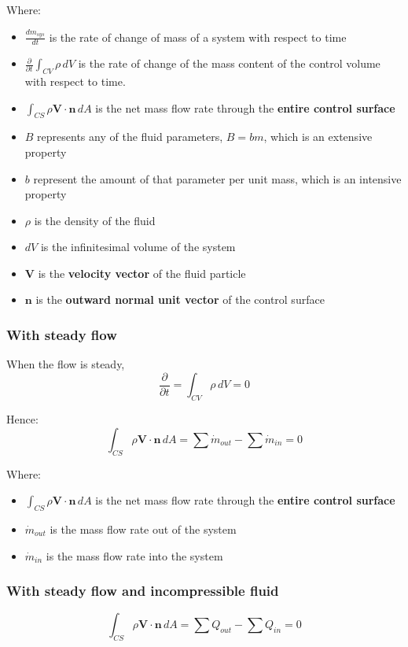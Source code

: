 \documentclass[11pt]{article}
\begin{document}
Where:
\begin{itemize}
\item \(\frac{dm_{sys}}{dt}\) is the rate of change of mass of a system with respect to time
\item \(\frac{\partial}{\partial t} \int_{CV} \rho \, dV\) is the rate of change of the mass content of the control volume with respect to time.
\item \(\int_{CS} \rho \boldsymbol{V} \cdot \boldsymbol{n} \, dA\) is the net mass flow rate through the \textbf{entire control surface}
\item \(B\) represents any of the fluid parameters, \(B = bm\), which is an extensive property
\item \(b\) represent the amount of that parameter per unit mass, which is an intensive property
\item \(\rho\) is the density of the fluid
\item \(dV\) is the infinitesimal volume of the system
\item \(\boldsymbol{V}\) is the \textbf{velocity vector} of the fluid particle
\item \(\boldsymbol{n}\) is the \textbf{outward normal unit vector} of the control surface
\end{itemize}

\newpage

\subsubsection{With steady flow}
\label{sec:orgb1fac68}
When the flow is steady,
\[\frac{\partial}{\partial t} = \int_{CV} \rho \, dV = 0\]

Hence:
\[\int_{CS} \rho \boldsymbol{V} \cdot \boldsymbol{n} \, dA = \sum \dot{m}_{out} - \sum \dot{m}_{in} = 0\]

Where:
\begin{itemize}
\item \(\int_{CS} \rho \boldsymbol{V} \cdot \boldsymbol{n} \, dA\) is the net mass flow rate through the \textbf{entire control surface}
\item \(\dot{m}_{out}\) is the mass flow rate out of the system
\item \(\dot{m}_{in}\) is the mass flow rate into the system
\end{itemize}

\subsubsection{With steady flow and incompressible fluid}
\label{sec:org69ddd80}
\[\int_{CS} \rho \boldsymbol{V} \cdot \boldsymbol{n} \, dA = \sum Q_{out} - \sum Q_{in} = 0\]
\end{document}
